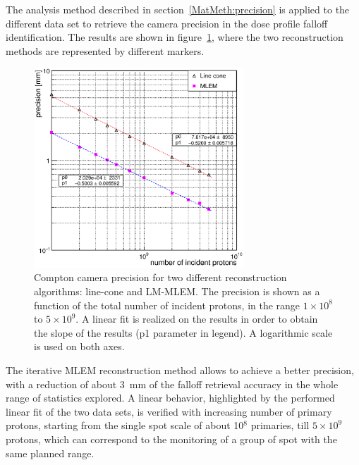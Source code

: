 The analysis method described in section~\ref{MatMeth:precision} is applied to the different data set to retrieve the camera precision in the dose profile falloff identification. The results are shown in figure~\ref{fig:precision}, where the two reconstruction methods are represented by different markers.

\begin{figure}	
\centering
\includegraphics[width=0.7\textwidth]{./Figure/2017-10-21_Precision_Comparaison_linecone_MLEM_Article_Fit.eps}
\caption{Compton camera precision for two different reconstruction algorithms: line-cone and LM-MLEM. The precision is shown as a function of the total number of incident protons, in the range $1\times10^{8}$ to $5\times10^{9}$. A linear fit is realized on the results in order to obtain the slope of the results (p1 parameter in legend). A logarithmic scale is used on both axes. }	
\label{fig:precision}
\end{figure}

The iterative MLEM reconstruction method allows to achieve a better precision, with a reduction of about 3~mm of the falloff retrieval accuracy in the whole range of statistics explored. A linear behavior, highlighted by the performed linear fit of the two data sets, is verified with increasing number of primary protons, starting from the single spot scale of about 10$^8$ primaries, till $5\times10^9$ protons, which can correspond to the monitoring of a group of spot with the same planned range. 

